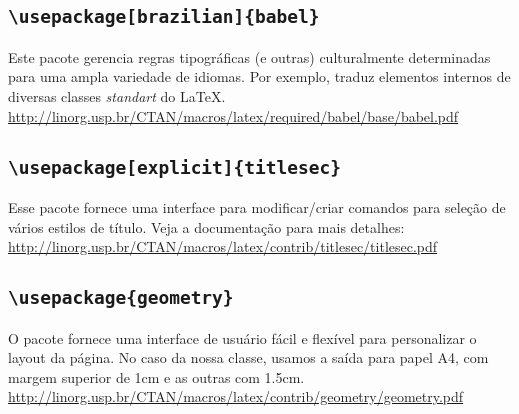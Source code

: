 \subsection*{\texttt{\textbackslash usepackage[brazilian]\{babel\}}}
Este pacote gerencia regras tipográficas (e outras) culturalmente determinadas 
para uma ampla variedade de idiomas.
Por exemplo, traduz elementos internos de diversas classes \textit{standart} do
\LaTeX.\\
{\small\url{http://linorg.usp.br/CTAN/macros/latex/required/babel/base/babel.pdf}}

\subsection*{\texttt{\textbackslash usepackage[explicit]\{titlesec\}}}
Esse pacote fornece uma interface para modificar/criar comandos para seleção de 
vários estilos de título.
Veja a documentação para mais detalhes:\\ 
{\small\url{http://linorg.usp.br/CTAN/macros/latex/contrib/titlesec/titlesec.pdf}}


\subsection*{\texttt{\textbackslash usepackage\{geometry\}}}
O pacote fornece uma interface de usuário fácil e flexível para personalizar o 
layout da página.
No caso da nossa classe, usamos a saída para papel A4, com margem superior de
1cm e as outras com 1.5cm.\\
{\small\url{http://linorg.usp.br/CTAN/macros/latex/contrib/geometry/geometry.pdf}}

